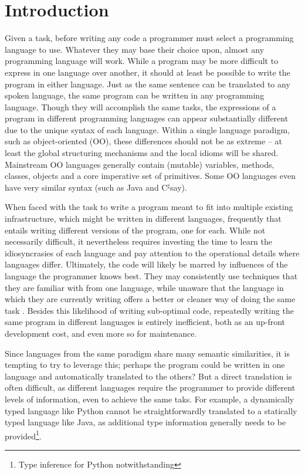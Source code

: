 \documentclass[sigplan,review,anonymous,prologue,dvipsnames]{acmart}
\newcommand{\Csharp}{C$^{\sharp}$}
\begin{document}
\section{Introduction}

Given a task, before writing any code a programmer must select a programming
language to use. Whatever they may base their choice upon, almost any
programming language will work. While a program may be more difficult to
express in one language over another, it should at least be possible to write
the program in either language. Just as the same sentence can be translated to
any spoken language, the same program can be written in any programming
language. Though they will accomplish the same tasks, the
expressions of a program in different programming languages can appear
substantially different due to the unique syntax of each language. Within a
single language paradigm, such as object-oriented (OO),
these differences should not be as extreme -- at least the global structuring
mechanisms and the local idioms will be shared.  Mainstream OO languages
generally contain (mutable) variables, methods, classes, objects and a core
imperative set of primitives. Some OO languages even have very similar syntax
(such as Java and \Csharp say).

When faced with the task to write a program meant to fit into multiple existing
infrastructure, which might be written in different languages, frequently that
entails writing different versions of the program, one for each. While not
necessarily difficult, it nevertheless
requires investing the time to learn the idiosyncrasies of each language and
pay attention to the operational details where languages differ. Ultimately,
the code will likely be marred by influences of the language the programmer
knows best. They may consistently use techniques that they are familiar with
from one language, while unaware that the language in which they are currently
writing offers a better or cleaner way of doing the same task
\cite{scholtz1990learning, alexandron2012effect}. Besides this
likelihood of writing sub-optimal code, repeatedly writing the same program in
different languages is entirely inefficient, both as an up-front development cost,
and even more so for maintenance.

Since languages from the same paradigm share many semantic similarities,
it is tempting to try to leverage this; perhaps the program could be written in
one language and
automatically translated to the others?  But a direct translation is often
difficult, as different languages require the programmer to provide different
levels of information, even to achieve the same taks.  For example, a dynamically
typed language like Python
cannot be straightforwardly translated to a statically typed
language like Java, as additional type information generally needs to be
provided\footnote{Type inference for Python notwithstanding}.
\end{document}
